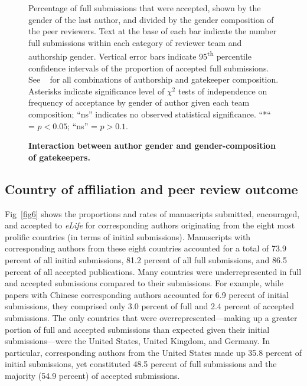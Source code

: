 \documentclass[10pt,letterpaper]{article}
\begin{document}
\begin{figure}[!h]
\caption{\bf Interaction between author gender and gender-composition of gatekeepers.}
Percentage of full submissions that were accepted, shown by the gender of the last author, and divided by the gender composition of the peer reviewers. Text at the base of each bar indicate the number full submissions within each category of reviewer team and authorship gender. Vertical error bars indicate 95\textsuperscript{th} percentile confidence intervals of the proportion of accepted full submissions. See ~ for all combinations of authorship and gatekeeper composition. Asterisks indicate significance level of $\chi^{2}$ tests of independence on frequency of acceptance by gender of author given each team composition; “ns” indicates no observed statistical significance. “*“ = $p < 0.05$; “ns” = $p > 0.1$.
\label{fig5}
\end{figure}

\subsection*{Country of affiliation and peer review outcome}

Fig~\ref{fig6} shows the proportions and rates of manuscripts submitted, encouraged, and accepted to \textit{eLife} for corresponding authors originating from the eight most prolific countries (in terms of initial submissions). Manuscripts with corresponding authors from these eight countries accounted for a total of 73.9 percent of all initial submissions, 81.2 percent of all full submissions, and 86.5 percent of all accepted publications. Many countries were underrepresented in full and accepted submissions compared to their submissions. For example, while papers with Chinese corresponding authors accounted for 6.9 percent of initial submissions, they comprised only 3.0 percent of full and 2.4 percent of accepted submissions. The only countries that were overrepresented—making up a greater portion of full and accepted submissions than expected given their initial submissions—were the United States, United Kingdom, and Germany. In particular, corresponding authors from the United States made up 35.8 percent of initial submissions, yet constituted 48.5 percent of full submissions and the majority (54.9 percent) of accepted submissions. 
\end{document}
